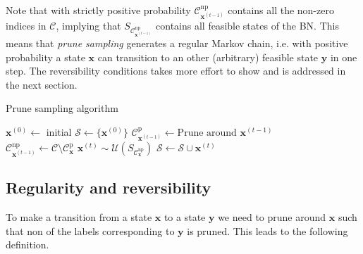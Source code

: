 \documentclass[a4paper, twoside, 11pt]{report}
\newcommand{\bfx}{{\mathbf{x}}}
\newcommand{\C}{{\mathcal C}}
\newcommand{\U}{{\mathcal{U}}}
\theoremstyle{plain}
\theoremstyle{definition}
\theoremstyle{remark}
\newcommand{\ps}{\textit{prune sampling }}
\newcommand{\bfy}{{\mathbf{y}}}
\begin{document}
Note that with strictly positive probability $\C_{\bfx^{(t-1)}}^{\text{np}}$ contains all the non-zero indices in $\C$, implying that $S_{\C_{\bfx^{(t-1)}}^{\text{np}}}$ contains all feasible states of the BN. This means that \ps generates a regular Markov chain, i.e. with positive probability a state $\bfx$ can transition to an other (arbitrary) feasible state $\bfy$ in one step. The reversibility conditions takes more effort to show and is addressed in the next section. 
\begin{algorithm}[h!]
\renewcommand\thealgorithm{1}
\caption{Prune sampling algorithm}
\label{prunealg}
\begin{algorithmic}
\State $\mathbf{x}^{(0)} \gets $ initial
     \State $\mathcal{S} \gets \{\mathbf{x}^{(0)}\}$
     \State $\C_{\bfx^{(t-1)}}^{\text{p}} \gets \text{Prune around } \mathbf{x}^{(t-1)}$ \\ 
	\State $\C_{\bfx^{(t-1)}}^{\text{np}} \gets \mathcal{C} \setminus \C_\bfx^{\text{p}}$  
     \State $\mathbf{x}^{(t)} \sim  \U(S_{\C_\bfx^{\text{np}}}) $ 
     \State $\mathcal{S} \gets \mathcal{S} \cup \mathbf{x}^{(t)}$
     \EndFor
     \State {}
\EndFunction
\end{algorithmic}
\end{algorithm}

\subsection{Regularity and reversibility}
To make a transition from a state $\bfx$ to a state $\bfy$ we need to prune around $\bfx$ such that non of the labels corresponding to $\bfy$ is pruned. This leads to the following definition. 
\end{document}

